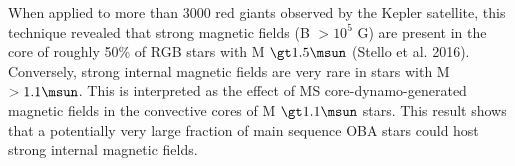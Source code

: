 When applied to more than 3000 red giants observed by the Kepler satellite, this technique revealed that
strong magnetic fields (B $\gt 10^5$ G) are present in the core of roughly 50\% of RGB stars with M $\gt 1.5\msun$ (Stello et al. 2016).
Conversely, strong internal magnetic fields are very rare in stars with M $> 1.1\msun$. This is interpreted as the
effect of MS core-dynamo-generated magnetic fields in the convective cores of M $\gt 1.1\msun$ stars.
This result shows that a potentially very large fraction of main sequence OBA stars could host strong internal magnetic fields.




